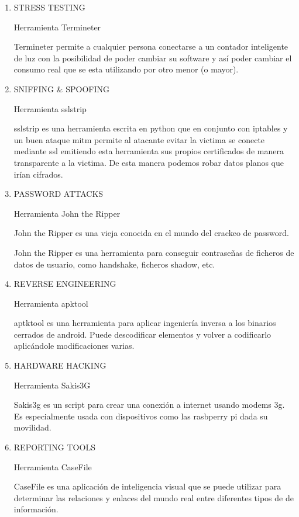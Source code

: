 \documentclass[a4paper]{article}
\begin{document}
\begin{enumerate}
\item STRESS TESTING

Herramienta Termineter

Termineter permite a cualquier persona conectarse a un contador inteligente de luz con la posibilidad de poder cambiar su software y así poder cambiar el consumo real que se esta utilizando por otro menor (o mayor).


\item SNIFFING \& SPOOFING


Herramienta sslstrip

sslstrip es una herramienta escrita en python que en conjunto con iptables y un buen ataque mitm permite al atacante evitar la victima se conecte mediante ssl emitiendo esta herramienta sus propios certificados de manera transparente a la victima. De esta manera podemos robar datos planos que irían cifrados.


\item PASSWORD ATTACKS

Herramienta John the Ripper

John the Ripper es una vieja conocida en el mundo del crackeo de password.

John the Ripper es una herramienta para conseguir contraseñas de ficheros de datos de usuario, como handshake, ficheros shadow, etc. 


\item REVERSE ENGINEERING

Herramienta apktool

aptktool es una herramienta para aplicar ingeniería inversa a los binarios cerrados de android. Puede descodificar elementos y volver a codificarlo aplicándole modificaciones varias.   



\item HARDWARE HACKING

Herramienta Sakis3G

Sakis3g es un script para crear una conexión a internet usando modems 3g. Es especialmente usada con dispositivos como las rasbperry pi dada su movilidad.


\item REPORTING TOOLS

Herramienta CaseFile

CaseFile es una aplicación de inteligencia visual que se puede utilizar para determinar las relaciones y enlaces del mundo real entre diferentes tipos de  de información.



\end{enumerate}
\end{document}

